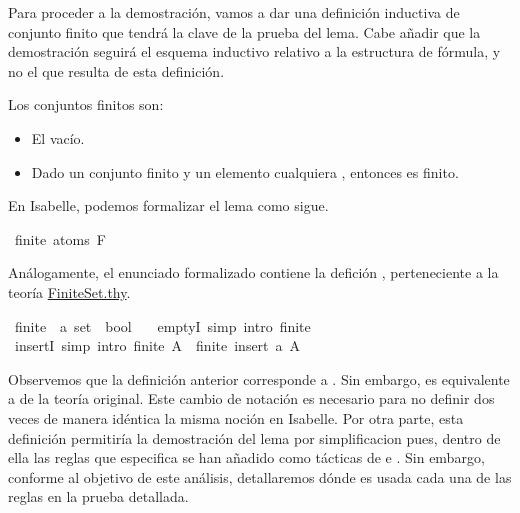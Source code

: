 \begin{isabellebody}
\begin{isamarkuptext}
  Para proceder a la demostración, vamos a dar una definición inductiva 
  de conjunto finito que tendrá la clave de la prueba del lema. Cabe 
  añadir que la demostración seguirá el esquema inductivo relativo a la 
  estructura de fórmula, y no el que resulta de esta definición.

  \begin{definicion}
    Los conjuntos finitos son:
      \begin{itemize}
        \item El vacío.
        \item Dado un conjunto finito  y un elemento cualquiera , 
          entonces  es finito.
      \end{itemize}
  \end{definicion}


  En Isabelle, podemos formalizar el lema como sigue.%
\end{isamarkuptext}\isamarkuptrue%
\isamarkupfalse%
\ {\isachardoublequoteopen}finite\ {\isacharparenleft}atoms\ F{\isacharparenright}{\isachardoublequoteclose}\isanewline
%
\isadelimproof
\ \ %
\endisadelimproof
%
\isatagproof
{}\isamarkupfalse%
%
\endisatagproof
{\isafoldproof}%
%
\isadelimproof
%
\endisadelimproof
%
\begin{isamarkuptext}%
Análogamente, el enunciado formalizado contiene la defición 
  , perteneciente a la teoría 
  \href{https://n9.cl/x86r}{FiniteSet.thy}.%
\end{isamarkuptext}\isamarkuptrue%
\isamarkupfalse%
\ finite{\isacharprime}\ {\isacharcolon}{\isacharcolon}\ {\isachardoublequoteopen}{\isacharprime}a\ set\ {\isasymRightarrow}\ bool{\isachardoublequoteclose}\ \isanewline
\ \ emptyI{\isacharprime}\ {\isacharbrackleft}simp{\isacharcomma}\ intro{\isacharbang}{\isacharbrackright}{\isacharcolon}\ {\isachardoublequoteopen}finite{\isacharprime}\ {\isacharbraceleft}{\isacharbraceright}{\isachardoublequoteclose}\isanewline
{\isacharbar}\ insertI{\isacharprime}\ {\isacharbrackleft}simp{\isacharcomma}\ intro{\isacharbang}{\isacharbrackright}{\isacharcolon}\ {\isachardoublequoteopen}finite{\isacharprime}\ A\ {\isasymLongrightarrow}\ finite{\isacharprime}\ {\isacharparenleft}insert\ a\ A{\isacharparenright}{\isachardoublequoteclose}%
\begin{isamarkuptext}%
Observemos que la definición anterior corresponde a 
  . Sin embargo, es equivalente a  de la 
  teoría original. Este cambio de notación es necesario para no definir 
  dos veces de manera idéntica la misma noción en Isabelle. Por otra 
  parte, esta definición permitiría la demostración del lema por 
  simplificacion pues, dentro de ella las reglas que especifica se han 
  añadido como tácticas de  e . Sin embargo, conforme al 
  objetivo de este análisis, detallaremos dónde es usada cada una de las 
  reglas en la prueba detallada. 


\end{isamarkuptext}
\end{isabellebody}
